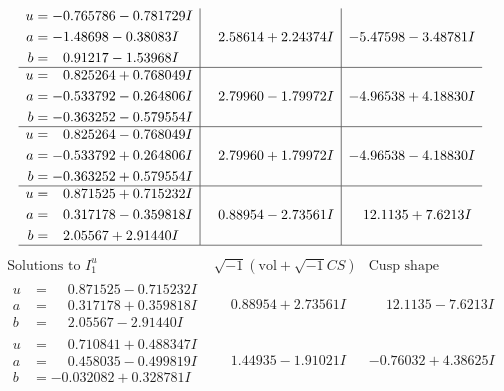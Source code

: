 \documentclass[1p]{elsarticle_modified}
\theoremstyle{definition}
\newcommand{\I}{\sqrt{-1}}
\begin{document}
$$\begin{array}{c|c|c}
\begin{aligned}
u &= -0.765786 - 0.781729 I \\
a &= -1.48698 - 0.38083 I \\
b &= \phantom{-}0.91217 - 1.53968 I\end{aligned}
 & \phantom{-}2.58614 + 2.24374 I & -5.47598 - 3.48781 I \\ \hline\begin{aligned}
u &= \phantom{-}0.825264 + 0.768049 I \\
a &= -0.533792 - 0.264806 I \\
b &= -0.363252 - 0.579554 I\end{aligned}
 & \phantom{-}2.79960 - 1.79972 I & -4.96538 + 4.18830 I \\ \hline\begin{aligned}
u &= \phantom{-}0.825264 - 0.768049 I \\
a &= -0.533792 + 0.264806 I \\
b &= -0.363252 + 0.579554 I\end{aligned}
 & \phantom{-}2.79960 + 1.79972 I & -4.96538 - 4.18830 I \\ \hline\begin{aligned}
u &= \phantom{-}0.871525 + 0.715232 I \\
a &= \phantom{-}0.317178 - 0.359818 I \\
b &= \phantom{-}2.05567 + 2.91440 I\end{aligned}
 & \phantom{-}0.88954 - 2.73561 I & \phantom{-}12.1135 + 7.6213 I\\
 \hline 
 \end{array}$$\newpage$$\begin{array}{c|c|c}  
\text{Solutions to }I^u_{1}& \I (\text{vol} + \sqrt{-1}CS) & \text{Cusp shape}\\
 \hline 
\begin{aligned}
u &= \phantom{-}0.871525 - 0.715232 I \\
a &= \phantom{-}0.317178 + 0.359818 I \\
b &= \phantom{-}2.05567 - 2.91440 I\end{aligned}
 & \phantom{-}0.88954 + 2.73561 I & \phantom{-}12.1135 - 7.6213 I \\ \hline\begin{aligned}
u &= \phantom{-}0.710841 + 0.488347 I \\
a &= \phantom{-}0.458035 - 0.499819 I \\
b &= -0.032082 + 0.328781 I\end{aligned}
 & \phantom{-}1.44935 - 1.91021 I & -0.76032 + 4.38625 I \\ \hline\begin{aligned}

\end{aligned}
\end{array}$$
\end{document}
